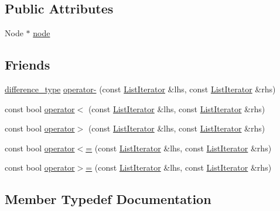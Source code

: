 \subsection*{Public Attributes}
\begin{DoxyCompactItemize}
\item 
Node $\ast$ \hyperlink{structprism_1_1containers_1_1_list_iterator_ac9b55317f6af025037e1fad2b35c3e11}{node}
\end{DoxyCompactItemize}
\subsection*{Friends}
\begin{DoxyCompactItemize}
\item 
\hyperlink{structprism_1_1containers_1_1_list_iterator_a5d36bc90dfcc66e888054ac1fa8de786}{difference\+\_\+type} \hyperlink{structprism_1_1containers_1_1_list_iterator_a01e380163ea6e4fb773286d7bd686849}{operator-\/} (const \hyperlink{structprism_1_1containers_1_1_list_iterator}{List\+Iterator} \&lhs, const \hyperlink{structprism_1_1containers_1_1_list_iterator}{List\+Iterator} \&rhs)
\item 
const bool \hyperlink{structprism_1_1containers_1_1_list_iterator_aa7501fb72489926b6f26af9d96fed162}{operator$<$} (const \hyperlink{structprism_1_1containers_1_1_list_iterator}{List\+Iterator} \&lhs, const \hyperlink{structprism_1_1containers_1_1_list_iterator}{List\+Iterator} \&rhs)
\item 
const bool \hyperlink{structprism_1_1containers_1_1_list_iterator_ae2b61ea00839123548f4ba3be724099f}{operator$>$} (const \hyperlink{structprism_1_1containers_1_1_list_iterator}{List\+Iterator} \&lhs, const \hyperlink{structprism_1_1containers_1_1_list_iterator}{List\+Iterator} \&rhs)
\item 
const bool \hyperlink{structprism_1_1containers_1_1_list_iterator_a53203b9e759f5084811e75a8d1276e0c}{operator$<$=} (const \hyperlink{structprism_1_1containers_1_1_list_iterator}{List\+Iterator} \&lhs, const \hyperlink{structprism_1_1containers_1_1_list_iterator}{List\+Iterator} \&rhs)
\item 
const bool \hyperlink{structprism_1_1containers_1_1_list_iterator_a12d57faad45d47f800bafabff2c8fbd1}{operator$>$=} (const \hyperlink{structprism_1_1containers_1_1_list_iterator}{List\+Iterator} \&lhs, const \hyperlink{structprism_1_1containers_1_1_list_iterator}{List\+Iterator} \&rhs)
\end{DoxyCompactItemize}


\subsection{Member Typedef Documentation}
